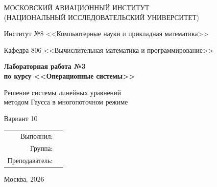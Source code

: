 \begin{titlepage}
\begin{center}
\large
МОСКОВСКИЙ АВИАЦИОННЫЙ ИНСТИТУТ\\
(НАЦИОНАЛЬНЫЙ ИССЛЕДОВАТЕЛЬСКИЙ УНИВЕРСИТЕТ)

\vspace{20pt}
Институт №8 <<Компьютерные науки и прикладная математика>>

Кафедра 806 <<Вычислительная математика и программирование>>
\end{center}
\vspace{60pt}
\begin{center}
\bfseries\large
Лабораторная работа №3\\
по курсу <<Операционные системы>>

\vspace{28pt}
Решение системы линейных уравнений\\
методом Гаусса в многопоточном режиме

\vspace{18pt}
Вариант 10
\end{center}
\vfill
\begin{flushright}
\large
\begin{tabular}{rl}
Выполнил: & \underline{\hspace{4cm}}\\[8pt]
Группа: & \underline{\hspace{4cm}}\\[8pt]
Преподаватель: & \underline{\hspace{4cm}}
\end{tabular}
\end{flushright}
\vspace{92pt}
\begin{center}\large Москва, 2026\end{center}
\end{titlepage}
